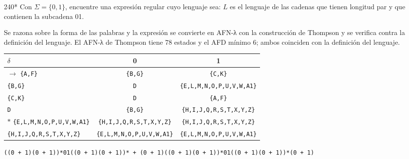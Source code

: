 \documentclass[11pt]{article}
\begin{document}
\begin{ejercicio}{240}{*}
Con $\Sigma = \{0, 1\}$, encuentre una expresión regular cuyo lenguaje sea: $L$ es el lenguaje de las cadenas que tienen longitud par y que contienen la subcadena 01.
\end{ejercicio}
\proc Se razona sobre la forma de las palabras y la expresión se convierte en AFN-λ con la construcción de Thompson y se verifica contra la definición del lenguaje. El AFN-λ de Thompson tiene 78 estados y el AFD mínimo 6; ambos coinciden con la definición del lenguaje.
\begin{center}\small\begin{tabular}{lcc}\toprule
$\delta$ & 0 & 1 \\\midrule
$\to$ \texttt{\{A,F\}} & \texttt{\{B,G\}} & \texttt{\{C,K\}} \\
 \texttt{\{B,G\}} & \texttt{D} & \texttt{\{E,L,M,N,O,P,U,V,W,A1\}} \\
 \texttt{\{C,K\}} & \texttt{D} & \texttt{\{A,F\}} \\
 \texttt{D} & \texttt{\{B,G\}} & \texttt{\{H,I,J,Q,R,S,T,X,Y,Z\}} \\
$*$ \texttt{\{E,L,M,N,O,P,U,V,W,A1\}} & \texttt{\{H,I,J,Q,R,S,T,X,Y,Z\}} & \texttt{\{H,I,J,Q,R,S,T,X,Y,Z\}} \\
 \texttt{\{H,I,J,Q,R,S,T,X,Y,Z\}} & \texttt{\{E,L,M,N,O,P,U,V,W,A1\}} & \texttt{\{E,L,M,N,O,P,U,V,W,A1\}} \\
\bottomrule\end{tabular}\end{center}

\resp \texttt{((0 + 1)(0 + 1))*01((0 + 1)(0 + 1))* + (0 + 1)((0 + 1)(0 + 1))*01((0 + 1)(0 + 1))*(0 + 1)}
\end{document}
